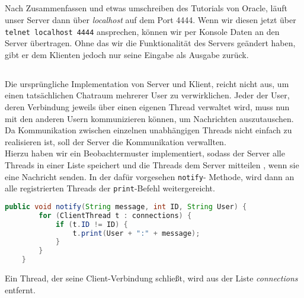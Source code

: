 \documentclass{scrartcl}
\begin{document}
    \subsection{}
    \label{sub:5.2}
      Nach Zusammenfassen und etwas umschreiben des Tutorials von Oracle, läuft
      unser Server dann über \textit{localhost} auf dem Port 4444. Wenn wir
      diesen jetzt über \texttt{telnet localhost 4444} ansprechen, können
      wir per Konsole Daten an den Server übertragen. Ohne das wir die
      Funktionalität des Servers geändert haben, gibt er dem Klienten jedoch
      nur seine Eingabe als Ausgabe zurück.
    \subsection{}
    \label{sub:5.3}
      Die ursprüngliche Implementation von Server und Klient, reicht nicht aus,
      um einen tatsächlichen Chatraum mehrerer User zu verwirklichen.
      Jeder der User, deren Verbindung jeweils über einen eigenen Thread
      verwaltet wird, muss nun mit den anderen Usern kommunizieren können,
      um Nachrichten auszutauschen. Da Kommunikation zwischen einzelnen
      unabhängigen Threads nicht einfach zu realisieren ist, soll der Server
      die Kommunikation verwallten.\\
      Hierzu haben wir ein Beobachtermuster implementiert, sodass der Server
      alle Threads in einer Liste speichert und die Threads dem Server mitteilen
      , wenn sie eine Nachricht senden. In der dafür vorgesehen \texttt{notify}-
      Methode, wird dann an alle registrierten Threads der \texttt{print}-Befehl
      weitergereicht.
      \begin{lstlisting}[language=java]
        public void notify(String message, int ID, String User) {
		for (ClientThread t : connections) {
			if (t.ID != ID) {
				t.print(User + ":" + message);
			}
		}
	}
      \end{lstlisting}
      Ein Thread, der seine Client-Verbindung schließt, wird aus der Liste
      \textit{connections} entfernt.
\end{document}
